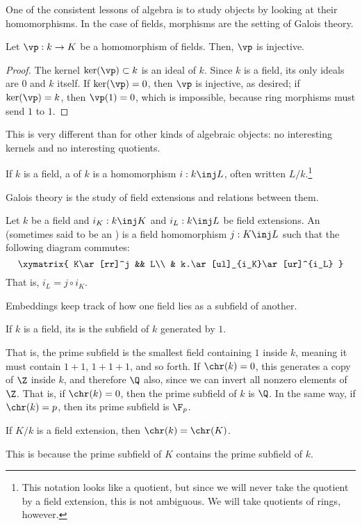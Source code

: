 One of the consistent lessons of algebra is to study objects by looking at their homomorphisms. In the case of
fields, morphisms are the setting of Galois theory.
\begin{lem}
Let $\vp:k\to K$ be a homomorphism of fields. Then, $\vp$ is injective.
\end{lem}
\begin{proof}
The kernel $\ker(\vp)\subset k$ is an ideal of $k$. Since $k$ is a field, its only ideals are $0$ and $k$ itself.
If $\ker(\vp) = 0$, then $\vp$ is injective, as desired; if $\ker(\vp) = k$, then $\vp(1) = 0$, which is
impossible, because ring morphisms must send $1$ to $1$.
\end{proof}
This is very different than for other kinds of algebraic objects: no interesting kernels and no interesting
quotients.
\begin{defn}
If $k$ is a field, a  of $k$ is a homomorphism $i:k\inj L$, often written
$L/k$.\footnote{This notation looks like a quotient, but since we will never take the quotient by a field
extension, this is not ambiguous. We will take quotients of rings, however.}
\end{defn}
Galois theory is the study of field extensions and relations between them.
\begin{defn}
Let $k$ be a field and $i_K:k\inj K$ and $i_L:k\inj L$ be field extensions. An 
(sometimes said to be an ) is a field homomorphism $j:K\inj L$ such that the following
diagram commutes:
\[\xymatrix{
	K\ar[rr]^j && L\\
	& k.\ar[ul]_{i_K}\ar[ur]^{i_L}
}\]
That is, $i_L = j\circ i_K$.
\end{defn}
Embeddings keep track of how one field lies as a subfield of another.
\begin{defn}
If $k$ is a field, its  is the subfield of $k$ generated by $1$.
\end{defn}
That is, the prime subfield is the smallest field containing $1$ inside $k$, meaning it must contain $1+1$,
$1+1+1$, and so forth. If $\chr(k) = 0$, this generates a copy of $\Z$ inside $k$, and therefore $\Q$ also, since
we can invert all nonzero elements of $\Z$. That is, if $\chr(k) = 0$, then the prime subfield of $k$ is $\Q$.
In the same way, if $\chr(k) = p$, then its prime subfield is $\F_p$.
\begin{cor}
If $K/k$ is a field extension, then $\chr(k) = \chr(K)$.
\end{cor}
This is because the prime subfield of $K$ contains the prime subfield of $k$.
